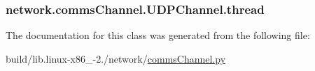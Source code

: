 \subsubsection[{thread}]{\setlength{\rightskip}{0pt plus 5cm}network.\+comms\+Channel.\+U\+D\+P\+Channel.\+thread}\label{classnetwork_1_1commsChannel_1_1UDPChannel_a8def8c5020988707811a671264d3b8b7}


The documentation for this class was generated from the following file\+:\begin{DoxyCompactItemize}
\item 
build/lib.\+linux-\/x86\+\_-\/2./network/\hyperlink{build_2lib_8linux-x86__64-2_87_2network_2commsChannel_8py}{comms\+Channel.\+py}\end{DoxyCompactItemize}
